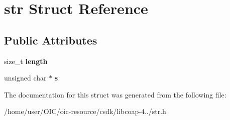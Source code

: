 \hypertarget{structstr}{}\section{str Struct Reference}
\label{structstr}
\subsection*{Public Attributes}
\begin{DoxyCompactItemize}
\item 
\hypertarget{structstr_adc0b39006b7798519822101b0150d82c}{}size\+\_\+t {\bfseries length}\label{structstr_adc0b39006b7798519822101b0150d82c}

\item 
\hypertarget{structstr_a84cc767c4dd6eae353682a00a55ac837}{}unsigned char $\ast$ {\bfseries s}\label{structstr_a84cc767c4dd6eae353682a00a55ac837}

\end{DoxyCompactItemize}


The documentation for this struct was generated from the following file\+:\begin{DoxyCompactItemize}
\item 
/home/user/\+O\+I\+C/oic-\/resource/csdk/libcoap-\/4../str.\+h\end{DoxyCompactItemize}

